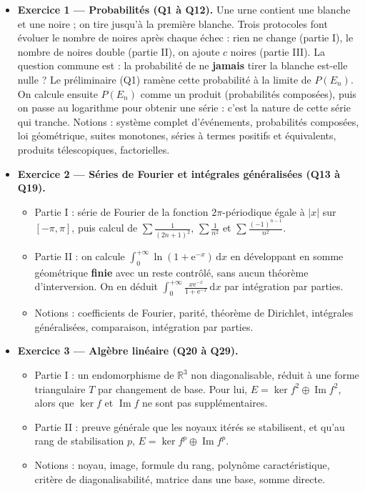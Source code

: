\documentclass[11pt,a4paper]{article}
\providecommand{\tightlist}{\setlength{\itemsep}{0pt}\setlength{\parskip}{0pt}}
\begin{document}
\begin{itemize}
\tightlist
\item
  \textbf{Exercice 1 --- Probabilités (Q1 à Q12).} Une urne contient une blanche et une noire ; on tire jusqu'à la première blanche. Trois protocoles font évoluer le nombre de noires après chaque échec : rien ne change (partie I), le nombre de noires double (partie II), on ajoute \(c\) noires (partie III). La question commune est : la probabilité de ne \textbf{jamais} tirer la blanche est-elle nulle ? Le préliminaire (Q1) ramène cette probabilité à la limite de \(P(E_n)\). On calcule ensuite \(P(E_n)\) comme un produit (probabilités composées), puis on passe au logarithme pour obtenir une série : c'est la nature de cette série qui tranche. Notions : système complet d'événements, probabilités composées, loi géométrique, suites monotones, séries à termes positifs et équivalents, produits télescopiques, factorielles.
\item
  \textbf{Exercice 2 --- Séries de Fourier et intégrales généralisées (Q13 à Q19).}

  \begin{itemize}
  \tightlist
  \item
    Partie I : série de Fourier de la fonction \(2\pi\)-périodique égale à \(|x|\) sur \([-\pi,\pi]\), puis calcul de \(\sum\frac1{(2n+1)^2}\), \(\sum\frac1{n^2}\) et \(\sum\frac{(-1)^{n-1}}{n^2}\).
  \item
    Partie II : on calcule \(\int_0^{+\infty}\ln(1+\mathrm e^{-x})\,\mathrm dx\) en développant en somme géométrique \textbf{finie} avec un reste contrôlé, sans aucun théorème d'interversion. On en déduit \(\int_0^{+\infty}\frac{x\mathrm e^{-x}}{1+\mathrm e^{-x}}\,\mathrm dx\) par intégration par parties.
  \item
    Notions : coefficients de Fourier, parité, théorème de Dirichlet, intégrales généralisées, comparaison, intégration par parties.
  \end{itemize}
\item
  \textbf{Exercice 3 --- Algèbre linéaire (Q20 à Q29).}

  \begin{itemize}
  \tightlist
  \item
    Partie I : un endomorphisme de \(\mathbb R^3\) non diagonalisable, réduit à une forme triangulaire \(T\) par changement de base. Pour lui, \(E=\ker f^2\oplus\operatorname{Im}f^2\), alors que \(\ker f\) et \(\operatorname{Im}f\) ne sont pas supplémentaires.
  \item
    Partie II : preuve générale que les noyaux itérés se stabilisent, et qu'au rang de stabilisation \(p\), \(E=\ker f^p\oplus\operatorname{Im}f^p\).
  \item
    Notions : noyau, image, formule du rang, polynôme caractéristique, critère de diagonalisabilité, matrice dans une base, somme directe.
  \end{itemize}
\end{itemize}
\end{document}
